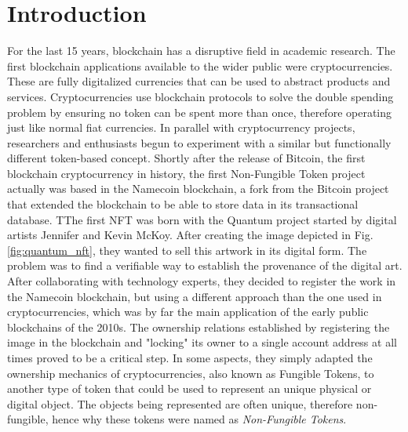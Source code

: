 \documentclass[../main.tex]{subfiles}
\begin{document}
\section{Introduction}
\label{sec:introduction}

For the last 15 years, blockchain has a disruptive field in academic research. The first blockchain applications available to the wider public were cryptocurrencies. These are fully digitalized currencies that can be used to abstract products and services. Cryptocurrencies use blockchain protocols to solve the double spending problem by ensuring no token can be spent more than once, therefore operating just like normal fiat currencies. In parallel with cryptocurrency projects, researchers and enthusiasts begun to experiment with a similar but functionally different token-based concept. Shortly after the release of Bitcoin, the first blockchain cryptocurrency in history, the first Non-Fungible Token project actually was based in the Namecoin blockchain, a fork from the Bitcoin project that extended the blockchain to be able to store data in its transactional database. TThe first NFT was born with the Quantum project \cite{Exmundo2023} started by digital artists Jennifer and Kevin McKoy. After creating the image depicted in Fig. \ref{fig:quantum_nft}, they wanted to sell this artwork in its digital form. The problem was to find a verifiable way to establish the provenance of the digital art. After collaborating with technology experts, they decided to register the work in the Namecoin blockchain, but using a different approach than the one used in cryptocurrencies, which was by far the main application of the early public blockchains of the 2010s. The ownership relations established by registering the image in the blockchain and "locking" its owner to a single account address at all times proved to be a critical step. In some aspects, they simply adapted the ownership mechanics of cryptocurrencies, also known as Fungible Tokens, to another type of token that could be used to represent an unique physical or digital object. The objects being represented are often unique, therefore non-fungible, hence why these tokens were named as \textit{Non-Fungible Tokens}.
\par
\end{document}
